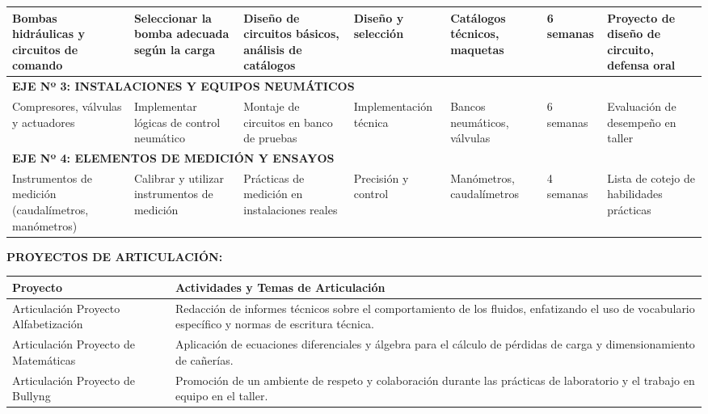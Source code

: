 \documentclass[11pt, a4paper]{article}
\begin{document}
\begin{longtable}{|p{2.5cm}|p{3cm}|p{4cm}|p{3cm}|p{2.5cm}|p{1.5cm}|p{3cm}|}
\hline
Bombas hidráulicas y circuitos de comando & Seleccionar la bomba adecuada según la carga & Diseño de circuitos básicos, análisis de catálogos & Diseño y selección & Catálogos técnicos, maquetas & 6 semanas & Proyecto de diseño de circuito, defensa oral \\
\hline
\multicolumn{7}{|l|}{\textbf{EJE Nº 3: INSTALACIONES Y EQUIPOS NEUMÁTICOS}} \\
\hline
Compresores, válvulas y actuadores & Implementar lógicas de control neumático & Montaje de circuitos en banco de pruebas & Implementación técnica & Bancos neumáticos, válvulas & 6 semanas & Evaluación de desempeño en taller \\
\hline
\multicolumn{7}{|l|}{\textbf{EJE Nº 4: ELEMENTOS DE MEDICIÓN Y ENSAYOS}} \\
\hline
Instrumentos de medición (caudalímetros, manómetros) & Calibrar y utilizar instrumentos de medición & Prácticas de medición en instalaciones reales & Precisión y control & Manómetros, caudalímetros & 4 semanas & Lista de cotejo de habilidades prácticas \\
\hline
\end{longtable}

\vspace{1em}
\noindent \textbf{PROYECTOS DE ARTICULACIÓN:}
\begin{tabular}{|p{5cm}|p{12cm}|}
\hline
\rowcolor{gray!20} \textbf{Proyecto} & \textbf{Actividades y Temas de Articulación} \\
\hline
Articulación Proyecto Alfabetización & Redacción de informes técnicos sobre el comportamiento de los fluidos, enfatizando el uso de vocabulario específico y normas de escritura técnica. \\
\hline
Articulación Proyecto de Matemáticas & Aplicación de ecuaciones diferenciales y álgebra para el cálculo de pérdidas de carga y dimensionamiento de cañerías. \\
\hline
Articulación Proyecto de Bullyng & Promoción de un ambiente de respeto y colaboración durante las prácticas de laboratorio y el trabajo en equipo en el taller. \\
\hline
\end{tabular}
\end{document}
